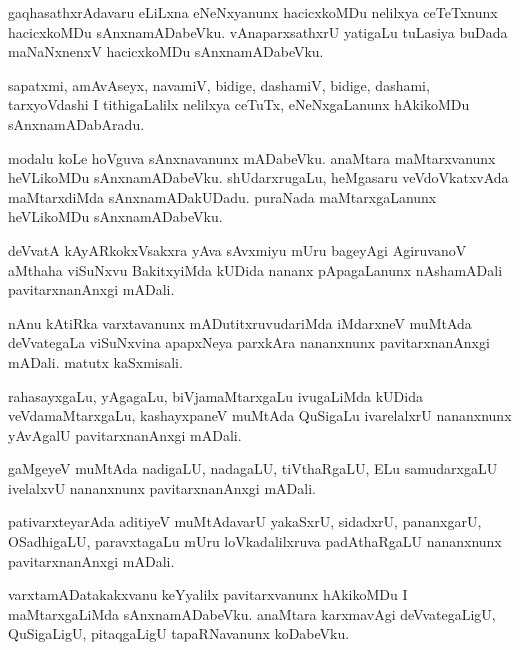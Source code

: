 \documentclass{article}
\begin{document}
\begin{mn}%
gaqhasathxrAdavaru eLiLxna eNeNxyanunx hacicxkoMDu nelilxya ceTeTxnunx hacicxkoMDu sAnxnamADabeVku. 
vAnaparxsathxrU yatigaLu tuLasiya buDada maNaNxnenxV hacicxkoMDu sAnxnamADabeVku.
\end{mn}

\begin{mn}%
sapatxmi, amAvAseyx, navamiV, bidige, dashamiV, bidige, dashami, tarxyoVdashi I tithigaLalilx 
nelilxya ceTuTx, eNeNxgaLanunx hAkikoMDu sAnxnamADabAradu.
\end{mn}

\begin{mn}%
modalu koLe hoVguva sAnxnavanunx mADabeVku. anaMtara maMtarxvanunx heVLikoMDu sAnxnamADabeVku. 
shUdarxrugaLu, heMgasaru veVdoVkatxvAda maMtarxdiMda sAnxnamADakUDadu. puraNada maMtarxgaLanunx 
heVLikoMDu sAnxnamADabeVku.
\end{mn}

\begin{mn}%
deVvatA kAyARkokxVsakxra yAva sAvxmiyu mUru bageyAgi AgiruvanoV aMthaha viSuNxvu BakitxyiMda kUDida 
nananx pApagaLanunx nAshamADali pavitarxnanAnxgi mADali.
\end{mn}

\begin{mn}%
nAnu kAtiRka varxtavanunx mADutitxruvudariMda iMdarxneV  muMtAda deVvategaLa viSuNxvina apapxNeya 
parxkAra nananxnunx pavitarxnanAnxgi mADali. matutx kaSxmisali.
\end{mn}

\begin{mn}%
rahasayxgaLu, yAgagaLu, biVjamaMtarxgaLu ivugaLiMda kUDida veVdamaMtarxgaLu, kashayxpaneV muMtAda 
QuSigaLu ivarelalxrU nananxnunx yAvAgalU pavitarxnanAnxgi mADali.
\end{mn}

\begin{mn}%
gaMgeyeV muMtAda nadigaLU, nadagaLU, tiVthaRgaLU, ELu samudarxgaLU ivelalxvU nananxnunx 
pavitarxnanAnxgi mADali.
\end{mn}

\begin{mn}%
pativarxteyarAda aditiyeV muMtAdavarU yakaSxrU, sidadxrU, pananxgarU, OSadhigaLU, paravxtagaLu mUru 
loVkadalilxruva padAthaRgaLU nananxnunx pavitarxnanAnxgi mADali.
\end{mn}

\begin{mn}%
varxtamADatakakxvanu keYyalilx pavitarxvanunx hAkikoMDu I maMtarxgaLiMda sAnxnamADabeVku. anaMtara 
karxmavAgi deVvategaLigU, QuSigaLigU, pitaqgaLigU tapaRNavanunx koDabeVku.
\end{mn}
\end{document}
